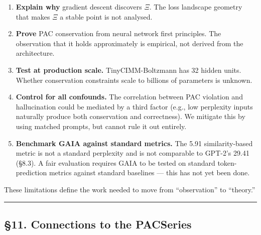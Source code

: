 \documentclass[
  11pt,
  a4paper]{article}
\begin{document}
\begin{enumerate}
\def\labelenumi{\arabic{enumi}.}
\item
  \textbf{Explain why} gradient descent discovers \(\Xi\). The loss
  landscape geometry that makes \(\Xi\) a stable point is not analysed.
\item
  \textbf{Prove} PAC conservation from neural network first principles.
  The observation that it holds approximately is empirical, not derived
  from the architecture.
\item
  \textbf{Test at production scale.} TinyCIMM-Boltzmann has 32 hidden
  units. Whether conservation constraints scale to billions of
  parameters is unknown.
\item
  \textbf{Control for all confounds.} The correlation between PAC
  violation and hallucination could be mediated by a third factor (e.g.,
  low perplexity inputs naturally produce both conservation and
  correctness). We mitigate this by using matched prompts, but cannot
  rule it out entirely.
\item
  \textbf{Benchmark GAIA against standard metrics.} The 5.91
  similarity-based metric is not a standard perplexity and is not
  comparable to GPT-2's 29.41 (§8.3). A fair evaluation requires GAIA to
  be tested on standard token-prediction metrics against standard
  baselines --- this has not yet been done.
\end{enumerate}

These limitations define the work needed to move from ``observation'' to
``theory.''

\begin{center}\rule{0.5\linewidth}{0.5pt}\end{center}

\subsection{§11. Connections to the
PACSeries}\label{connections-to-the-pacseries}
\end{document}
